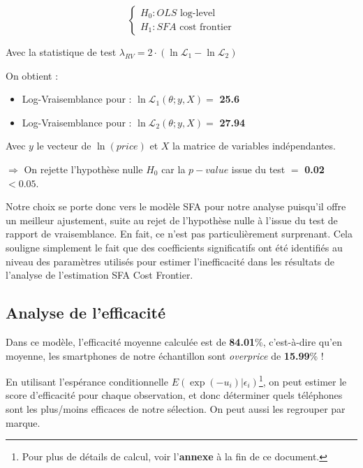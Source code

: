 \documentclass[
  12pt,
]{report}
\renewcommand{\texttt}[1]{\colorbox{light}{\color{highlight}{\ttfamily{#1}}}}
\begin{document}
\[
\begin{cases}
H_0: OLS \text{ log-level}\\
H_1: SFA \text{ cost frontier}
\end{cases}
\]

Avec la statistique de test
\(\lambda_{RV} = 2 \cdot \left(\ln \mathcal{L_1}- \ln \mathcal{L_2}\right)\)

On obtient :

\begin{itemize}
\item
  Log-Vraisemblance pour \texttt{OLS\ log-level} :
  \({\displaystyle {\ln\mathcal {L_1}}(\theta ;y, X)}=\) \textbf{25.6}
\item
  Log-Vraisemblance pour \texttt{SFA\ Cost\ Frontier} :
  \({\displaystyle {\ln\mathcal {L_2}}(\theta ;y, X)}=\) \textbf{27.94}
\end{itemize}

Avec \(y\) le vecteur de \(\ln(price)\) et \(X\) la matrice de variables
indépendantes.

\(\Rightarrow\) On rejette l'hypothèse nulle \(H_0\) car la \(p-value\)
issue du test \(=\) \textbf{0.02} \(< 0.05\).

Notre choix se porte donc vers le modèle SFA pour notre analyse
puisqu'il offre un meilleur ajustement, suite au rejet de l'hypothèse
nulle à l'issue du test de rapport de vraisemblance. En fait, ce n'est
pas particulièrement surprenant. Cela souligne simplement le fait que
des coefficients significatifs ont été identifiés au niveau des
paramètres utilisés pour estimer l'inefficacité dans les résultats de
l'analyse de l'estimation SFA Cost Frontier.

\subsection{Analyse de l'efficacité}\label{analyse-de-lefficacituxe9}

Dans ce modèle, l'efficacité moyenne calculée est de \textbf{84.01}\%,
c'est-à-dire qu'en moyenne, les smartphones de notre échantillon sont
\emph{overprice} de \textbf{15.99}\% !

En utilisant l'espérance conditionnelle
\(E(\exp(-u_i) | \epsilon_i)\)\footnote{Pour plus de détails de calcul,
  voir l'\textbf{annexe} à la fin de ce document.}, on peut estimer le
score d'efficacité pour chaque observation, et donc déterminer quels
téléphones sont les plus/moins efficaces de notre sélection. On peut
aussi les regrouper par marque.
\end{document}
